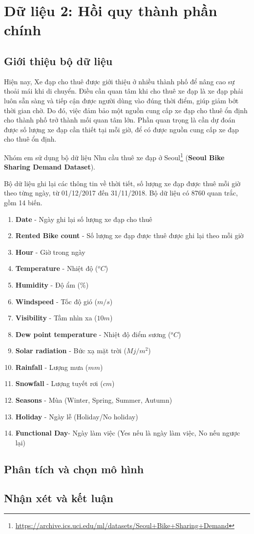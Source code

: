 \section{Dữ liệu 2: Hồi quy thành phần chính}

\subsection*{Giới thiệu bộ dữ liệu}
Hiện nay, Xe đạp cho thuê được giới thiệu ở nhiều thành phố để nâng cao sự thoải mái khi di chuyển. Điều cần quan tâm khi cho thuê xe đạp là xe đạp phải luôn sẵn sàng và tiếp cận được người dùng vào đúng thời điểm, giúp giảm bớt thời gian chờ. Do đó, việc đảm bảo một nguồn cung cấp xe đạp cho thuê ổn định cho thành phố trở thành mối quan tâm lớn. Phần quan trọng là cần dự đoán được số lượng xe đạp cần thiết tại mỗi giờ, để có được nguồn cung cấp xe đạp cho thuê ổn định.

Nhóm em sử dụng bộ dữ liệu Nhu cầu thuê xe đạp ở Seoul\footnote{\url{https://archive.ics.uci.edu/ml/datasets/Seoul+Bike+Sharing+Demand}} (\textbf{Seoul Bike Sharing Demand Dataset}).

Bộ dữ liệu ghi lại các thông tin về thời tiết, số lượng xe đạp được thuê mỗi giờ theo từng ngày, từ 01/12/2017 đến 31/11/2018. Bộ dữ liệu có 8760 quan trắc, gồm 14 biến.
\begin{enumerate}
	\item \textbf{Date} - Ngày ghi lại số lượng xe đạp cho thuê
	\item \textbf{Rented Bike count} - Số lượng xe đạp được thuê được ghi lại theo mỗi giờ
	\item \textbf{Hour} - Giờ trong ngày
	\item \textbf{Temperature} - Nhiệt độ ($^o C$)
	\item \textbf{Humidity} - Độ ẩm (\%)
	\item \textbf{Windspeed} - Tốc độ gió ($m/s$)
	\item \textbf{Visibility} - Tầm nhìn xa ($10m$)
	\item \textbf{Dew point temperature} - Nhiệt độ điểm sương ($^o C$)
	\item \textbf{Solar radiation} - Bức xạ mặt trời ($Mj/m^2$)
	\item \textbf{Rainfall} - Lượng mưa ($mm$)
	\item \textbf{Snowfall} - Lượng tuyết rơi ($cm$)
	\item \textbf{Seasons} - Mùa (Winter, Spring, Summer, Autumn)
	\item \textbf{Holiday} - Ngày lễ (Holiday/No holiday)
	\item \textbf{Functional Day}- Ngày làm việc (Yes nếu là ngày làm việc, No nếu ngược lại)
\end{enumerate}


\subsection*{Phân tích và chọn mô hình}

\subsection*{Nhận xét và kết luận}
